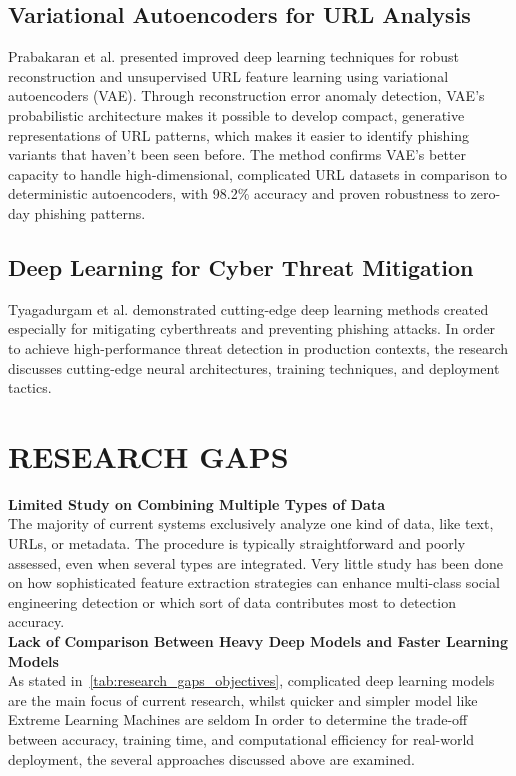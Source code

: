 \subsection{Variational Autoencoders for URL Analysis}
Prabakaran et al. presented improved deep learning techniques for robust reconstruction and unsupervised URL feature learning using variational autoencoders (VAE). Through reconstruction error anomaly detection, VAE's probabilistic architecture makes it possible to develop compact, generative representations of URL patterns, which makes it easier to identify phishing variants that haven't been seen before. The method confirms VAE's better capacity to handle high-dimensional, complicated URL datasets in comparison to deterministic autoencoders, with 98.2\% accuracy and proven robustness to zero-day phishing patterns.
%
\subsection{Deep Learning for Cyber Threat Mitigation}
Tyagadurgam et al. demonstrated cutting-edge deep learning methods created especially for mitigating cyberthreats and preventing phishing attacks. In order to achieve high-performance threat detection in production contexts, the research discusses cutting-edge neural architectures, training techniques, and deployment tactics.
%
\section{RESEARCH GAPS} 
\textbf{Limited Study on Combining Multiple Types of Data} \\
The majority of current systems exclusively analyze one kind of data, like text, URLs, or metadata. The procedure is typically straightforward and poorly assessed, even when several types are integrated. Very little study has been done on how sophisticated feature extraction strategies can enhance multi-class social engineering detection or which sort of data contributes most to detection accuracy.\\

\textbf{Lack of Comparison Between Heavy Deep Models and Faster Learning Models}\\
As stated in~\ref{tab:research_gaps_objectives}, complicated deep learning models are the main focus of current research, whilst quicker and simpler model like Extreme Learning Machines are seldom
In order to determine the trade-off between accuracy, training time, and computational efficiency for real-world deployment, the several approaches discussed above are examined.\\

